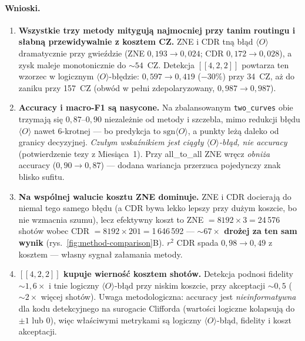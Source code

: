 \documentclass[11pt,a4paper]{article}
\begin{document}
\paragraph{Wnioski.}
\begin{enumerate}
\item \textbf{Wszystkie trzy metody mitygują najmocniej przy tanim routingu i słabną
      przewidywalnie z kosztem CZ.} ZNE i CDR tną błąd $\langle O\rangle$ dramatycznie przy
      gwieździe (ZNE $0{,}193{\to}0{,}024$; CDR $0{,}172{\to}0{,}028$), a zysk maleje monotonicznie
      do ${\sim}54$~CZ. Detekcja $[[4,2,2]]$ powtarza ten wzorzec w logicznym $\langle O\rangle$-błędzie:
      $0{,}597{\to}0{,}419$ ($-30\%$) przy 34~CZ, aż do zaniku przy 157~CZ (obwód w pełni
      zdepolaryzowany, $0{,}987{\to}0{,}987$).
\item \textbf{Accuracy i macro-F1 są nasycone.} Na zbalansowanym \texttt{two\_curves} obie
      trzymają się $0{,}87$--$0{,}90$ niezależnie od metody i szczebla, mimo redukcji błędu
      $\langle O\rangle$ nawet 6-krotnej --- bo predykcja to $\mathrm{sgn}\langle O\rangle$, a
      punkty leżą daleko od granicy decyzyjnej. \emph{Czułym wskaźnikiem jest ciągły
      $\langle O\rangle$-błąd, nie accuracy} (potwierdzenie tezy z Miesiąca~1). Przy all\_to\_all
      ZNE wręcz \emph{obniża} accuracy ($0{,}90{\to}0{,}87$) --- dodana wariancja przerzuca
      pojedynczy znak blisko sufitu.
\item \textbf{Na wspólnej walucie kosztu ZNE dominuje.} ZNE i CDR docierają do niemal tego samego
      błędu (a CDR bywa lekko lepszy przy dużym koszcie, bo nie wzmacnia szumu), lecz efektywny
      koszt to ZNE ${=}8192{\times}3={}$24\,576 shotów wobec CDR ${=}8192{\times}201={}$1\,646\,592
      --- \textbf{${\sim}67{\times}$ drożej za ten sam wynik} (rys.~\ref{fig:method-comparison}B).
      $r^2$ CDR spada $0{,}98{\to}0{,}49$ z kosztem --- własny sygnał załamania metody.
\item \textbf{$[[4,2,2]]$ kupuje wierność kosztem shotów.} Detekcja podnosi fidelity ${\sim}1{,}6{\times}$
      i tnie logiczny $\langle O\rangle$-błąd przy niskim koszcie, przy akceptacji ${\sim}0{,}5$
      (${\sim}2{\times}$ więcej shotów). Uwaga metodologiczna: accuracy jest \emph{nieinformatywna}
      dla kodu detekcyjnego na surogacie Clifforda (wartości logiczne kolapsują do $\pm1$ lub $0$),
      więc właściwymi metrykami są logiczny $\langle O\rangle$-błąd, fidelity i koszt akceptacji.
\end{enumerate}

\end{document}
